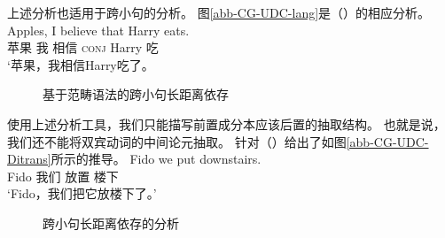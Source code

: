 \noindent
上述分析也适用于跨小句的分析。
图\vref{abb-CG-UDC-lang}是（）的相应分析。
\ea
\gll Apples, I believe that Harry eats. \\
     苹果 我 相信 \textsc{conj} Harry 吃 \\
\glt `苹果，我相信Harry吃了。
\z
\begin{figure}
\centerline{%
}
\caption{\label{abb-CG-UDC-lang}基于范畴语法的跨小句长距离依存}
\end{figure}%
%
使用上述分析工具，我们只能描写前置成分本应该后置的抽取结构。
也就是说，我们还不能将双宾动词的中间论元抽取\citep[]{Steedman85a-u}。
\citet[]{Pollard88a}针对（）给出了如图\vref{abb-CG-UDC-Ditrans}所示的推导。
\ea
\gll Fido we put downstairs. \\
     Fido 我们 放置 楼下 \\
\glt `Fido，我们把它放楼下了。'
\z
\begin{figure}
\centerline{%
}
\caption{\label{abb-CG-UDC-Ditrans}跨小句长距离依存的分析}
\end{figure}%
